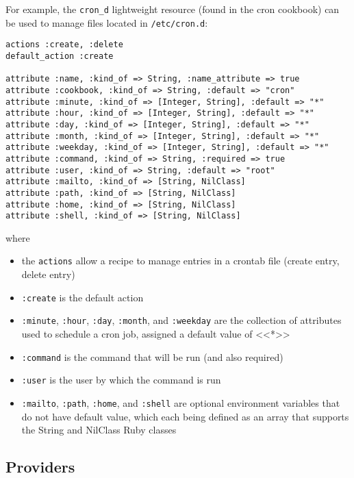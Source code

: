 For example, the \lstinline!cron_d! lightweight resource (found in the cron cookbook) can be used to manage files located in \lstinline!/etc/cron.d!:

\begin{lstlisting}[label=lst:cookbook-lwrp3]
actions :create, :delete
default_action :create

attribute :name, :kind_of => String, :name_attribute => true
attribute :cookbook, :kind_of => String, :default => "cron"
attribute :minute, :kind_of => [Integer, String], :default => "*"
attribute :hour, :kind_of => [Integer, String], :default => "*"
attribute :day, :kind_of => [Integer, String], :default => "*"
attribute :month, :kind_of => [Integer, String], :default => "*"
attribute :weekday, :kind_of => [Integer, String], :default => "*"
attribute :command, :kind_of => String, :required => true
attribute :user, :kind_of => String, :default => "root"
attribute :mailto, :kind_of => [String, NilClass]
attribute :path, :kind_of => [String, NilClass]
attribute :home, :kind_of => [String, NilClass]
attribute :shell, :kind_of => [String, NilClass]
\end{lstlisting}

where

\begin{itemize}
  \item the \lstinline!actions! allow a recipe to manage entries in a crontab file (create entry, delete entry)
  \item \lstinline!:create! is the default action
  \item \lstinline!:minute!, \lstinline!:hour!, \lstinline!:day!, \lstinline!:month!, and \lstinline!:weekday! are the collection of attributes used to schedule a cron job, assigned a default value of <<*>>
  \item \lstinline!:command! is the command that will be run (and also required)
  \item \lstinline!:user! is the user by which the command is run
  \item \lstinline!:mailto!, \lstinline!:path!, \lstinline!:home!, and \lstinline!:shell! are optional environment variables that do not have default value, which each being defined as an array that supports the String and NilClass Ruby classes
\end{itemize}

\subsection{Providers}

